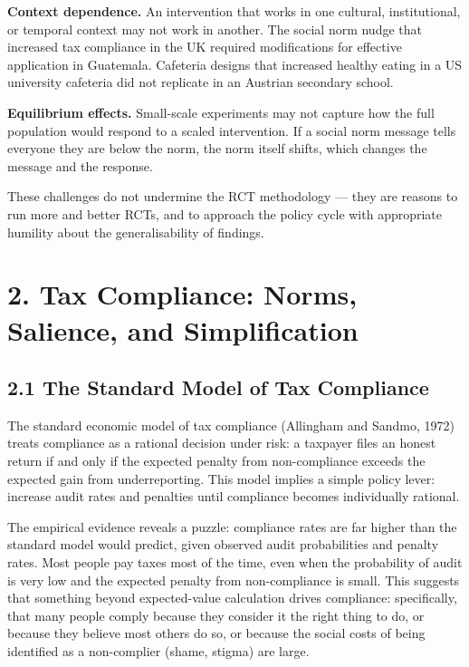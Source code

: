 \documentclass[12pt, letterpaper]{article}
\begin{document}
\textbf{Context dependence.} An intervention that works in one cultural, institutional, or temporal context may not work in another. The social norm nudge that increased tax compliance in the UK required modifications for effective application in Guatemala. Cafeteria designs that increased healthy eating in a US university cafeteria did not replicate in an Austrian secondary school.

\textbf{Equilibrium effects.} Small-scale experiments may not capture how the full population would respond to a scaled intervention. If a social norm message tells everyone they are below the norm, the norm itself shifts, which changes the message and the response.

These challenges do not undermine the RCT methodology --- they are reasons to run more and better RCTs, and to approach the policy cycle with appropriate humility about the generalisability of findings.

\medskip


\section{2. Tax Compliance: Norms, Salience, and Simplification}



\subsection{2.1 The Standard Model of Tax Compliance}


The standard economic model of tax compliance (Allingham and Sandmo, 1972) treats compliance as a rational decision under risk: a taxpayer files an honest return if and only if the expected penalty from non-compliance exceeds the expected gain from underreporting. This model implies a simple policy lever: increase audit rates and penalties until compliance becomes individually rational.

The empirical evidence reveals a puzzle: compliance rates are far higher than the standard model would predict, given observed audit probabilities and penalty rates. Most people pay taxes most of the time, even when the probability of audit is very low and the expected penalty from non-compliance is small. This suggests that something beyond expected-value calculation drives compliance: specifically, that many people comply because they consider it the right thing to do, or because they believe most others do so, or because the social costs of being identified as a non-complier (shame, stigma) are large.
\end{document}
